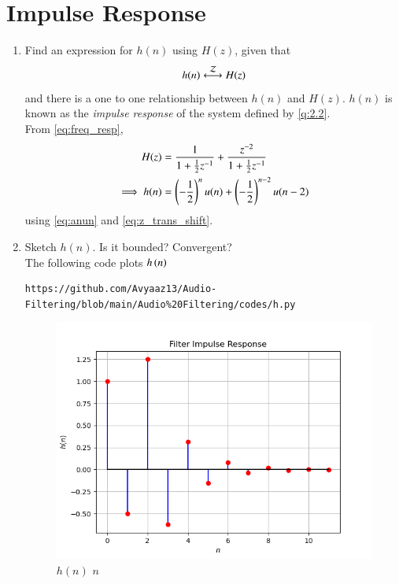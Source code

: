 \documentclass[journal,12pt,twocolumn]{IEEEtran}
\theoremstyle{remark}
\renewcommand\thesection{\arabic{section}}
\numberwithin{equation}{subsection}
\begin{document}
\section{Impulse Response}
\begin{enumerate}[label=\thesection.\arabic*]
\item \label{prob:impulse_resp}
Find an expression for $h(n)$ using $H(z)$, given that 
\begin{equation}
\label{eq:impulse_resp}
h(n) \system{Z} H(z)
\end{equation}
and there is a one to one relationship between $h(n)$ and $H(z)$. $h(n)$ is known as the {\em impulse response} of the
system defined by \eqref{q:2.2}.
\\
\solution From \eqref{eq:freq_resp},
\begin{align}
H(z) &= \frac{1}{1 + \frac{1}{2}z^{-1}} + \frac{ z^{-2}}{1 + \frac{1}{2}z^{-1}}
\\
\implies h(n) &= \left(-\frac{1}{2}\right)^{n}u(n) + \left(-\frac{1}{2}\right)^{n-2}u(n-2)
\end{align}
using \eqref{eq:anun} and \eqref{eq:z_trans_shift}.
\item Sketch $h(n)$. Is it bounded? Convergent? 
\\
\solution The following code plots $h\left(n\right)$ 
\begin{lstlisting}
https://github.com/Avyaaz13/Audio-Filtering/blob/main/Audio%20Filtering/codes/h.py
\end{lstlisting}
\begin{figure}[!ht]
\centering
\includegraphics[width=\columnwidth]{figs/hn}
\caption{$h(n)$  $n$}

\end{figure}
\end{enumerate}
\end{document}
